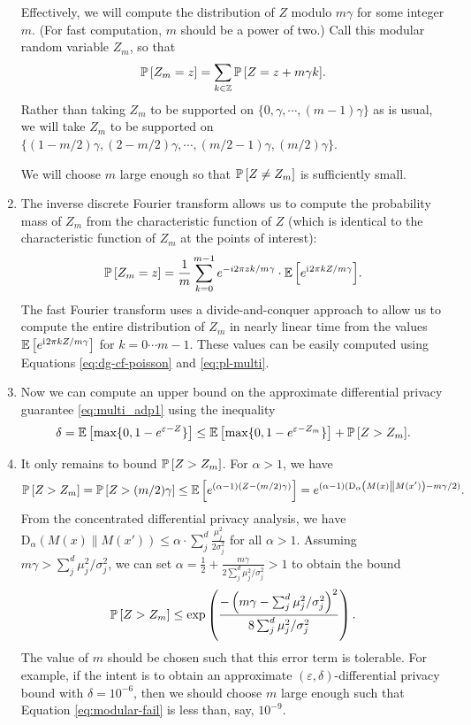 \documentclass{jpc}
\newcommand{\ii}{\mathrm{i}\mkern1mu}
\newcommand{\ex}[2]{{\ifx&#1& \mathbb{E} \else
\underset{#1}{\mathbb{E}} \fi \left[#2\right]}}
\newcommand{\pr}[2]{{\ifx&#1& \mathbb{P} \else
\underset{#1}{\mathbb{P}} \fi \left[#2\right]}}
\newcommand{\dr}[3]{\mathrm{D}_{#1}\left(#2\middle\|#3\right)}
\newcommand{\eps}{\varepsilon}
\newcommand{\Z}{\mathbb{Z}}
\begin{document}
\begin{enumerate}
    Effectively, we will compute the distribution of $Z$ modulo $m\gamma$ for some integer $m$. (For fast computation, $m$ should be a power of two.) Call this modular random variable $Z_m$, so that \[\pr{}{Z_m=z} = \sum_{k \in \Z} \pr{}{Z=z+m\gamma k}.\]
    Rather than taking $Z_m$ to be supported on $\{0,\gamma,\cdots,(m-1)\gamma\}$ as is usual, we will take $Z_m$ to be supported on $\{(1-m/2)\gamma,(2-m/2)\gamma, \cdots, (m/2-1)\gamma,(m/2)\gamma\}$.
    
    We will choose $m$ large enough so that $\pr{}{Z \ne Z_m}$ is sufficiently small.
    
    \item The inverse discrete Fourier transform allows us to compute the probability mass of $Z_m$ from the characteristic function of $Z$ (which is identical to the characteristic function of $Z_m$ at the points of interest):
    \begin{equation}
        \pr{}{Z_m=z} = \frac{1}{m} \sum_{k=0}^{m-1} e^{-i 2\pi zk / m\gamma} \cdot \ex{}{e^{\ii{} 2\pi k Z/m\gamma}}.\\
    \end{equation}
    The fast Fourier transform uses a divide-and-conquer approach to allow us to compute the entire distribution of $Z_m$ in nearly linear time from the values $\ex{}{e^{\ii{}2\pi k Z / m\gamma}}$ for $k=0 \cdots m-1$. These values can be easily computed using Equations \ref{eq:dg-cf-poisson} and \ref{eq:pl-multi}.
    
    \item Now we can compute an upper bound on the approximate differential privacy guarantee \eqref{eq:multi_adp1} using the inequality
    \begin{equation}
        \delta = \ex{}{\max\{0, 1-e^{\eps-Z}\}} \le \ex{}{\max\{0, 1-e^{\eps-Z_m}\}} + \pr{}{Z>Z_m}.
    \end{equation}
    
    \item It only remains to bound $\pr{}{Z>Z_m}$. For $\alpha>1$, we have
    \begin{equation}
        \pr{}{Z>Z_m} = \pr{}{Z > (m/2)\gamma} \le \ex{}{e^{(\alpha-1)(Z-(m/2)\gamma)}} = e^{(\alpha-1)(\dr{\alpha}{M(x)}{M(x')} -m \gamma /2 )}.
    \end{equation}
    From the concentrated differential privacy analysis, we have $\dr{\alpha}{M(x)}{M(x')} \le \alpha \cdot \sum_j^d \frac{\mu_j^2}{2\sigma_j^2}$ for all $\alpha>1$. Assuming $m\gamma > \sum_j^d \mu_j^2/\sigma_j^2$, we can set $\alpha = \frac12 + \frac{m\gamma}{2\sum_j^d \mu_j^2/\sigma_j^2}>1$ to obtain the bound 
    \begin{equation}
        \pr{}{Z>Z_m} \le \exp\left(\frac{-\left(m\gamma - \sum_j^d \mu_j^2/\sigma_j^2\right)^2}{8\sum_j^d \mu_j^2/\sigma_j^2}\right).\label{eq:modular-fail}
    \end{equation}
    The value of $m$ should be chosen such that this error term is tolerable. For example, if the intent is to obtain an approximate $(\eps,\delta)$-differential privacy bound with $\delta=10^{-6}$, then we should choose $m$ large enough such that Equation \ref{eq:modular-fail} is less than, say, $10^{-9}$.
    

\end{enumerate}
\end{document}
